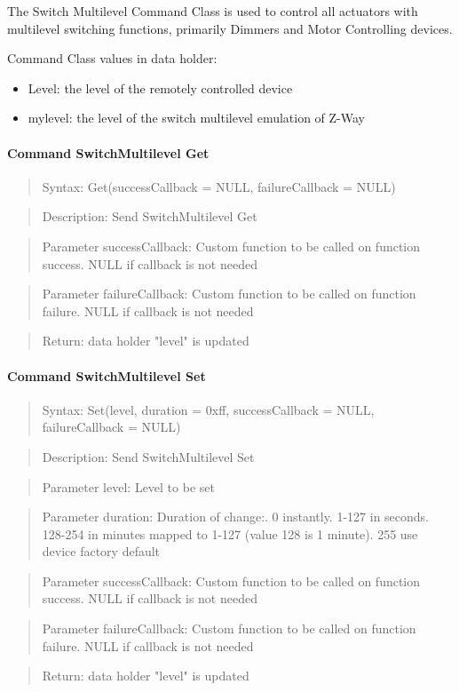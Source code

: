 The Switch Multilevel Command Class is used to control all actuators with multilevel switching functions, primarily Dimmers and Motor Controlling devices. 

Command Class values in data holder:
\begin{itemize}
\item Level: the level of the remotely controlled device
\item mylevel:  the level of the switch multilevel emulation of Z-Way
\end{itemize}

\paragraph {Command SwitchMultilevel Get}
\begin{quote} Syntax: Get(successCallback = NULL, failureCallback = NULL)\end{quote}
\begin{quote} Description: Send SwitchMultilevel Get\end{quote}
\begin{quote} Parameter successCallback: Custom function to be called on function success. NULL if callback is not needed\end{quote}
\begin{quote} Parameter failureCallback: Custom function to be called on function failure. NULL if callback is not needed\end{quote}
\begin{quote} Return: data holder "level" is updated\end{quote}

\paragraph {Command SwitchMultilevel Set}
\begin{quote} Syntax: Set(level, duration = 0xff, successCallback = NULL, failureCallback = NULL)\end{quote}
\begin{quote} Description: Send SwitchMultilevel Set\end{quote}
\begin{quote} Parameter level: Level to be set\end{quote}
\begin{quote} Parameter duration: Duration of change:. 0 instantly. 1-127 in seconds. 128-254 in minutes mapped to 1-127 (value 128 is 1 minute). 255 use device factory default\end{quote}
\begin{quote} Parameter successCallback: Custom function to be called on function success. NULL if callback is not needed\end{quote}
\begin{quote} Parameter failureCallback: Custom function to be called on function failure. NULL if callback is not needed\end{quote}
\begin{quote} Return: data holder "level" is updated\end{quote}


